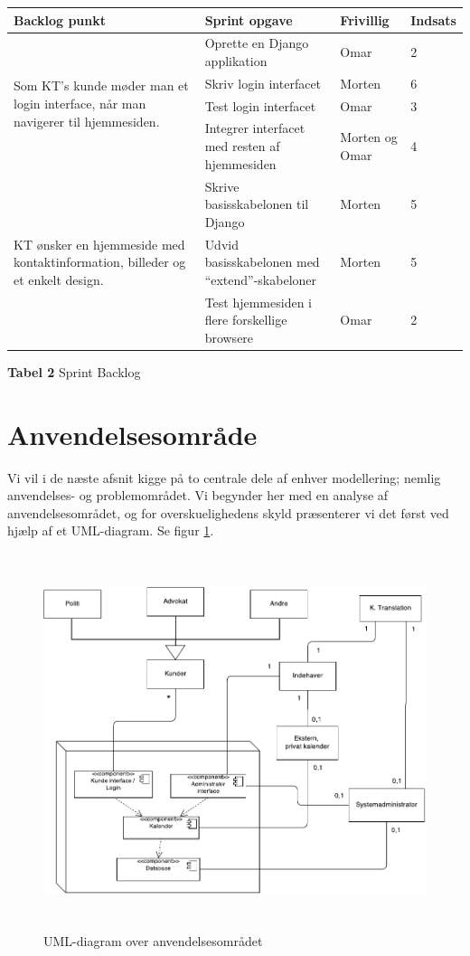 \documentclass[12pt]{article}   %
\begin{document}
\begin{center}
	\begin{tabular}{|l|p{4cm}|l|l|}
		\hline
		Backlog punkt & Sprint opgave & Frivillig & Indsats\\ \hline
		\multirow{4}{4cm}{Som KT's kunde møder man et login interface,
		når man navigerer til hjemmesiden.} & Oprette en Django
		applikation & Omar  & 2 \\
		& Skriv login interfacet & Morten & 6 \\
		& Test login interfacet & Omar & 3 \\
		& Integrer interfacet med resten af hjemmesiden & Morten og Omar
		& 4 \\ \hline
		\multirow{3}{4cm}{KT ønsker en hjemmeside med
		kontaktinformation, billeder og et enkelt design.} &
		Skrive basisskabelonen til Django & Morten & 5 \\
		& Udvid basisskabelonen med ``extend''-skabeloner & Morten & 5
		\\ & Test hjemmesiden i flere forskellige browsere & Omar & 2 \\
		\hline

	\end{tabular}
\caption{\textbf{Tabel 2} Sprint Backlog}
\end{center}
		

\section{Anvendelsesområde}
Vi vil i de næste afsnit kigge på to centrale dele af enhver modellering;
nemlig anvendelses- og problemområdet. Vi begynder her med en analyse af
anvendelsesområdet, og for overskuelighedens skyld præsenterer vi det først
ved hjælp af et UML-diagram. Se figur \ref{fig:anvend}.\\

\begin{figure}[!ht]
\includegraphics[width=12cm, height=11cm]{anvendelsesomr.pdf}
\caption{UML-diagram over anvendelsesområdet}
\label{fig:anvend}
\end{figure}
\end{document}
